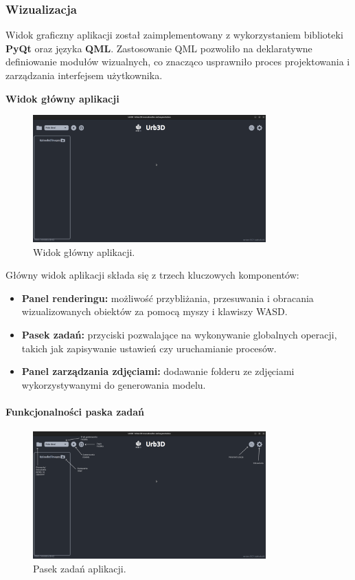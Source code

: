 \subsubsection{Wizualizacja}

Widok graficzny aplikacji został zaimplementowany z wykorzystaniem biblioteki \textbf{PyQt} oraz języka \textbf{QML}. Zastosowanie QML pozwoliło na deklaratywne definiowanie modułów wizualnych, co znacząco usprawniło proces projektowania i zarządzania interfejsem użytkownika.

\textbf{Widok główny aplikacji}
\begin{figure}[h!]
    \centering
    \includegraphics[width=0.8\textwidth]{img/wizualizacja/ui_glowny_widok.png}
    \caption{Widok główny aplikacji.}
\end{figure}

Główny widok aplikacji składa się z trzech kluczowych komponentów:
\begin{itemize}
    \item \textbf{Panel renderingu:} możliwość przybliżania, przesuwania i obracania wizualizowanych obiektów za pomocą myszy i klawiszy WASD.
    \item \textbf{Pasek zadań:} przyciski pozwalające na wykonywanie globalnych operacji, takich jak zapisywanie ustawień czy uruchamianie procesów.
    \item \textbf{Panel zarządzania zdjęciami:} dodawanie folderu ze zdjęciami wykorzystywanymi do generowania modelu.
\end{itemize}

\paragraph{Funkcjonalności paska zadań}
\begin{figure}[h!]
    \centering
    \includegraphics[width=0.8\textwidth]{img/wizualizacja/ui_opis_funk.png}
    \caption{Pasek zadań aplikacji.}
\end{figure}

